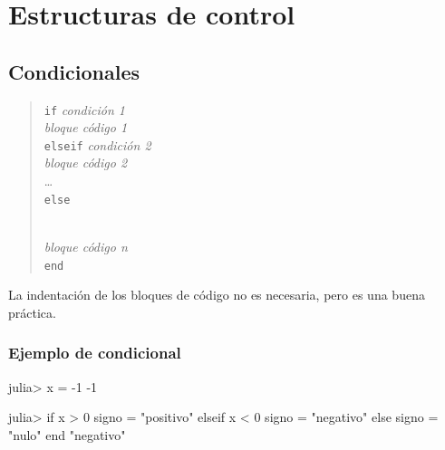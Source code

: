 \documentclass[
  letterpaper,
  DIV=11,
  numbers=noendperiod]{scrreprt}
\newenvironment{Shaded}{\begin{snugshade}}{\end{snugshade}}
\newcommand{\ControlFlowTok}[1]{\textcolor[rgb]{0.00,0.23,0.31}{#1}}
\newcommand{\FloatTok}[1]{\textcolor[rgb]{0.68,0.00,0.00}{#1}}
\newcommand{\NormalTok}[1]{\textcolor[rgb]{0.00,0.23,0.31}{#1}}
\newcommand{\OperatorTok}[1]{\textcolor[rgb]{0.37,0.37,0.37}{#1}}
\newcommand{\StringTok}[1]{\textcolor[rgb]{0.13,0.47,0.30}{#1}}
\begin{document}
\hypertarget{estructuras-de-control}{%
\chapter{Estructuras de control}\label{estructuras-de-control}}

\hypertarget{condicionales}{%
\section{Condicionales}\label{condicionales}}

\begin{quote}
\texttt{if} \emph{condición 1}\\
\hspace*{0.333em}\hspace*{0.333em}\hspace*{0.333em}\emph{bloque código
1}\\
\texttt{elseif} \emph{condición 2}\\
\hspace*{0.333em}\hspace*{0.333em}\hspace*{0.333em}\emph{bloque código
2}\\
\ldots{}\\
\texttt{else}\strut \\
\hspace*{0.333em}\hspace*{0.333em}\hspace*{0.333em}\emph{bloque código
n}\\
\texttt{end}
\end{quote}

La indentación de los bloques de código no es necesaria, pero es una
buena práctica.

\hypertarget{ejemplo-de-condicional}{%
\subsection{Ejemplo de condicional}\label{ejemplo-de-condicional}}

\begin{Shaded}
\begin{Highlighting}[]
\NormalTok{julia}\OperatorTok{\textgreater{}}\NormalTok{ x }\OperatorTok{=} \OperatorTok{{-}}\FloatTok{1}
\OperatorTok{{-}}\FloatTok{1}

\NormalTok{julia}\OperatorTok{\textgreater{}} \ControlFlowTok{if}\NormalTok{ x }\OperatorTok{\textgreater{}} \FloatTok{0}
\NormalTok{         signo }\OperatorTok{=} \StringTok{"positivo"}
       \ControlFlowTok{elseif}\NormalTok{ x }\OperatorTok{\textless{}} \FloatTok{0}
\NormalTok{         signo }\OperatorTok{=} \StringTok{"negativo"}
       \ControlFlowTok{else}
\NormalTok{         signo }\OperatorTok{=} \StringTok{"nulo"}
       \ControlFlowTok{end}
\StringTok{"negativo"}
\end{Highlighting}
\end{Shaded}
\end{document}
